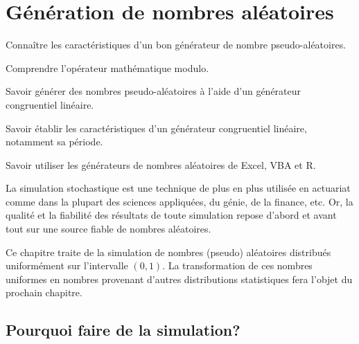 \chapter{Génération de nombres aléatoires}
\label{chap:generation}

\begin{objectifs}
\item Connaître les caractéristiques d’un bon générateur de nombre
  pseudo-aléatoires.
\item Comprendre l’opérateur mathématique modulo.
\item Savoir générer des nombres pseudo-aléatoires à l’aide d’un
  générateur congruentiel linéaire.
\item Savoir établir les caractéristiques d’un générateur congruentiel
  linéaire, notamment sa période.
\item Savoir utiliser les générateurs de nombres aléatoires de Excel,
  VBA et R.
\end{objectifs}

La simulation stochastique est une technique de plus en plus utilisée
en actuariat comme dans la plupart des sciences appliquées, du génie,
de la finance, etc. Or, la qualité et la fiabilité des résultats de
toute simulation repose d'abord et avant tout sur une source fiable de
nombres aléatoires.


Ce chapitre traite de la simulation de nombres (pseudo) aléatoires
distribués uniformément sur l'intervalle $(0, 1)$. La transformation
de ces nombres uniformes en nombres provenant d'autres distributions
statistiques fera l'objet du prochain chapitre.


\section{Pourquoi faire de la simulation?}
\label{sec:generation:pourquoi}

